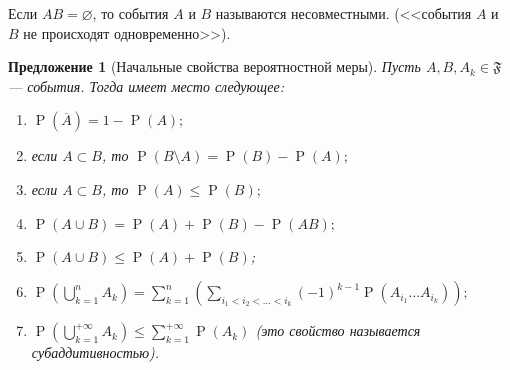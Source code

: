 \documentclass[12pt]{article}
\newtheorem{proposition}[theorem]{Предложение}
\numberwithin{theorem}{section}
\theoremstyle{definition}
\newcommand{\defin}[2]{\hypertarget{#2}{{\color{red} #1}}}
\newcommand{\prob}{\operatorname{P}}
\newcommand{\events}{\mathfrak{F}}
\begin{document}
	Если $ AB = \varnothing $, то события $ A $ и $ B $ называются \defin{несовместными}{}.
	(<<события $ A $ и $ B $ не происходят одновременно>>).
	
	\begin{proposition}[Начальные свойства вероятностной меры]
		Пусть $ A, B, A_k \in \events $ --- события.
		Тогда имеет место следующее:
		\begin{enumerate}
			\item $ \prob(\overline{A}) = 1 - \prob(A); $ \label{prob-prop1}
			\item если $ A \subset B $, то $ \prob(B \setminus A) = \prob(B) - \prob(A); $ \label{prob-prop2}
			\item если $ A \subset B $, то $ \prob(A) \leqslant \prob(B); $ \label{prob-prop2.5}
			\item $ \prob(A \cup B) = \prob(A) + \prob(B) - \prob(AB); $ \label{prob-prop3}
			\item $ \prob(A \cup B) \leqslant \prob(A) + \prob(B) $; \label{prob-prop4}
			\item $ \prob(\bigcup\limits_{k = 1}^{n} A_k) = \sum\limits_{k = 1}^{n} 
			\left(\sum\limits_{i_1 < i_2 < \ldots < i_k} (-1)^{k - 1}\prob(A_{i_1} \ldots A_{i_k})\right); $ \label{prob-prop5}
			\item $ \prob\left(\bigcup\limits_{k = 1}^{+\infty} A_k \right) \leqslant \sum\limits_{k = 1}^{+\infty} \prob(A_k) $ 
			(это свойство называется \defin{субаддитивностью}{subadditivity}). \label{prob-prop6}
		\end{enumerate}
	\end{proposition}
	
\end{document}
